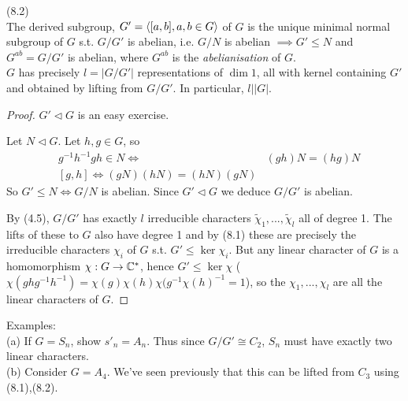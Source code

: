 \documentclass[a4paper]{article}
\begin{document}
\begin{lemma} (8.2)\\
The derived subgroup, $G' = \langle[a,b],a,b \in G \rangle$ of $G$ is the unique minimal normal subgroup of $G$ s.t. $G/G'$ is abelian, i.e. $G/N$ is abelian $\implies G' \leq N$ and $G^{ab}=G/G'$ is abelian, where $G^{ab}$ is the \emph{abelianisation} of $G$.\\
$G$ has precisely $l=|G/G'|$ representations of $\dim 1$, all with kernel containing $G'$ and obtained by lifting from $G/G'$. In particular, $l | |G|$.
\begin{proof}
$G'\triangleleft G$ is an easy exercise.

Let $N \triangleleft G$. Let $h,g \in G$, so 
\begin{equation*}
\begin{aligned}
&g^{-1}h^{-1}gh \in N \iff &(gh)N = (hg)N\\
&[g,h] \iff (gN)(hN) = (hN)(gN)
\end{aligned}
\end{equation*}
So $G' \leq N \iff G/N$ is abelian. Since $G' \triangleleft G$ we deduce $G/G'$ is abelian.

By (4.5), $G/G'$ has exactly $l$ irreducible characters $\tilde{\chi}_1,...,\tilde{\chi}_l$ all of degree 1. The lifts of these to $G$ also have degree 1 and by (8.1) these are precisely the irreducible characters $\chi_i$ of $G$ s.t. $G' \leq \ker \chi_i$. But any linear character of $G$ is a homomorphism $\chi:G \to \mathbb{C}^*$, hence $G' \leq \ker \chi$ ($\chi(ghg^{-1}h^{-1}) = \chi(g)\chi(h)\chi(g^{-1} \chi(h)^{-1} = 1$), so the $\chi_1,...,\chi_l$ are all the linear characters of $G$.
\end{proof}
\end{lemma}

Examples:\\
(a) If $G=S_n$, show $s'_n = A_n$. Thus since $G/G' \cong C_2$, $S_n$ must have exactly two linear characters.\\
(b) Consider $G=A_4$. We've seen previously that this can be lifted from $C_3$ using (8.1),(8.2).
\end{document}
